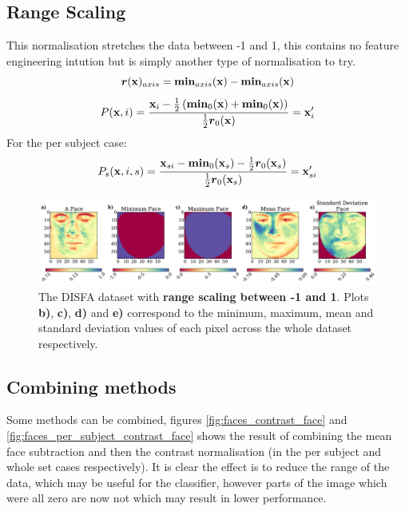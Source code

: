     \subsection{Range Scaling}
      This normalisation stretches the data between -1 and 1, this contains no feature engineering
      intution but is simply another type of normalisation to try.
      \begin{equation}
        {\boldsymbol r}({\bf x})_{axis} = {\boldsymbol \min}_{axis}({\bf x}) - {\boldsymbol \min}_{axis}({\bf x})
      \end{equation}
      \begin{equation}
         P({\bf x},i) =
         \frac{{\bf x}_{i} - \frac{1}{2}\left ( {\boldsymbol \min}_0({\bf x}) + {\boldsymbol \min}_0({\bf x}) \right ) }{\frac{1}{2}{\boldsymbol r}_0({\bf x})}
         = {\bf x}_{i}'
      \end{equation}
      For the per subject case:
      \begin{equation}
         P_s({\bf x},i,s) =
         \frac{{\bf x}_{si} - {\boldsymbol \min}_0({\bf x}_s) - \frac{1}{2}{\boldsymbol r}_0({\bf x}_s) }{\frac{1}{2}{\boldsymbol r}_0({\bf x}_s)}
         = {\bf x}_{si}'
      \end{equation}
      \begin{figure}[!h] \centering
      \includegraphics[width =\hsize]{figures/faces_range.pdf}
      \caption{The DISFA dataset with {\bf range scaling between -1 and 1}.
      Plots {\bf b)}, {\bf c)}, {\bf d)} and {\bf e)} correspond to the minimum,
      maximum, mean and standard deviation values of each pixel across the whole
      dataset respectively.} \label{fig:simple} \end{figure}

    \subsection{Combining methods}
      Some methods can be combined, figures \ref{fig:faces_contrast_face} and \ref{fig:faces_per_subject_contrast_face}
      shows the result of combining the mean face subtraction and then the
      contrast normalisation (in the per subject and whole set cases respectively). It is clear the effect is to
      reduce the range of the data, which may be useful for the classifier, however parts of the image
      which were all zero are now not which may result in lower performance.

